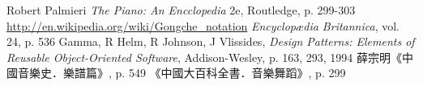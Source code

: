 \begin{thebibliography}{99} %
  Robert Palmieri
  \emph{The Piano: An Encclopedia}
  2e,
  Routledge,  
  p. 299-303
  \url{http://en.wikipedia.org/wiki/Gongche_notation}
  \emph{Encyclopædia Britannica}, vol. 24, p. 536
  Gamma, R Helm, R Johnson, J Vlissides, 
  \emph{Design Patterns: Elements of Reusable Object-Oriented Software},
  Addison-Wesley, p. 163, 293, 
  1994
  薛宗明《中國音樂史．樂譜篇》, p. 549
  《中國大百科全書．音樂舞蹈》, p. 299
\end{thebibliography}

